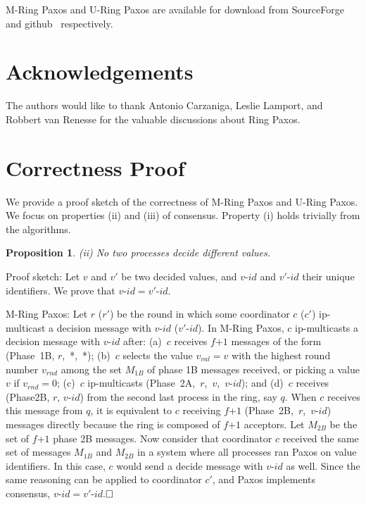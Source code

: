 \documentclass[final,3p,times,twocolumn,authoryear]{elsarticle}
\newtheorem{props}{Proposition}
\begin{document}
M-Ring Paxos and U-Ring Paxos are available for download from SourceForge~\cite{Libpaxos} and github~\cite{uringpaxos} respectively.


\section{Acknowledgements}
The authors would like to thank Antonio Carzaniga, Leslie Lamport, and Robbert van Renesse for the valuable discussions about Ring Paxos.\

 



\section*{Correctness Proof}
We provide a proof sketch of the correctness of M-Ring Paxos and U-Ring Paxos.
We focus on properties (ii) and (iii) of consensus. Property (i)
holds trivially from the algorithms.

\begin{props}
\vspace{1mm}
\hspace{-1mm}(ii) No two processes decide different values.
\end{props}
\vspace{1mm}
\noindent Proof sketch: Let $v$ and $v'$ be two decided values, and $v$-$id$ and $v'$-$id$ their unique identifiers. We prove that $v$-$id = v'$-$id$.

\vspace{1mm}
M-Ring Paxos: Let $r$ ($r'$) be the round in which some coordinator $c$ ($c'$) ip-multicast a decision message with $v$-$id$ ($v'$-$id$).
In M-Ring Paxos, $c$ ip-multicasts a decision message with $v$-$id$ after: (a)~$c$ receives $f$+$1$ messages of the form (Phase~1B, $r$,~*,~*); (b)~$c$ selects the value $\mathit{v_{val}} = v$ with the highest round number $\mathit{v_{rnd}}$ among the set $M_{1B}$ of phase 1B messages received, or picking a value $v$ if $\mathit{v_{rnd}} = 0$; (c)~$c$ ip-multicasts  (Phase~2A,~$r$,~$v$,~$v$-$id$); and (d)~$c$ receives (Phase2B, $r$, $v$-$id$) from the second last process in the ring, say $q$.
When $c$ receives this message from $q$, it is equivalent to $c$ receiving $f$+$1$ (Phase~2B,~$r$,~$v$-$id$) messages 
directly because the ring is composed of $f$+$1$ acceptors. Let $M_{2B}$ be the set of $f$+$1$ phase 2B messages. Now consider that coordinator $c$ received the same set of messages $M_{1B}$ and $M_{2B}$ in a system where all processes ran Paxos on value identifiers. In this case, $c$ would send a decide message with $v$-$id$ as well. Since the same reasoning can be applied to coordinator $c'$, and Paxos implements consensus, $v$-$id = v'$-$id$.$\hfill\square$
\end{document}
